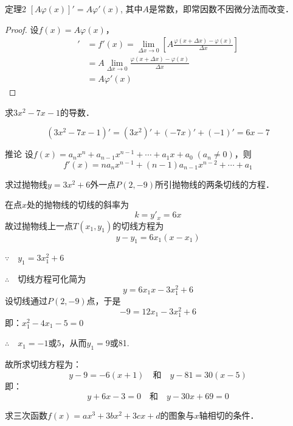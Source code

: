\begin{blk}
{定理2} $[A\varphi (x)]'=A\varphi'(x)$, 其中$A$是常数，即常因数不因微分法而改变．    
\end{blk}

\begin{proof}
设$f(x)=A\varphi(x)$， 
\begin{align*}
    [A\varphi(x)]'&=f'(x)=\lim_{\Delta x\to 0}\left[A\frac{\varphi(x+\Delta x)-\varphi(x)}{\Delta x}\right]\\
    &=A\lim_{\Delta x\to 0}\frac{\varphi(x+\Delta x)-\varphi(x)}{\Delta x}\\
    &=A\varphi'(x)
\end{align*}
\end{proof}

\begin{example}
    求$3x^2-7x-1$的导数．
\end{example}

\begin{solution}
\[  (3x^2-7x-1)'=(3x^2)'+(-7x)'+(-1)'=6x-7\]
\end{solution}    

\begin{blk}{推论}
设$f(x)=a_nx^n+a_{n-1}x^{n-1}+\cdots+a_1x+a_0\; (a_n\ne 0)$，则
\[f'(x)=na_nx^{n-1}+(n-1)a_{n-1}x^{n-2}+\cdots+a_1\]
\end{blk}

\begin{example}
求过抛物线$y=3x^2+6$外一点$P(2,-9)$所引抛物线的两条切线的方程．
\end{example}

\begin{solution}
在点$x$处的抛物线的切线的斜率为
\[k=y'_x=6x\]
故过抛物线上一点$T(x_1,y_1)$的切线方程为
\[y-y_1=6x_1 (x-x_1)\] 

$\because\quad y_1=3x^2_1+6$

$\therefore\quad $切线方程可化简为
\[    y=6x_1x-3x_1^2+6\]
设切线通过$P(2,-9)$点，于是
\[-9=12x_1-3x_1^2+6\]
即：$x_1^2-4x_1-5=0$

$\therefore\quad x_1=-1$或$5$，从而$y_1=9$或81.

故所求切线方程为：
\[y-9=-6(x+1)\quad\text{和}\quad y-81=30(x-5)\]
即：
\[y+6x-3=0\quad\text{和}\quad  y-30x+69=0\]
\end{solution}

\begin{example}
求三次函数$f(x)=ax^3+3bx^2+3cx+d$的图象与$x$轴相切的条件．
\end{example}

